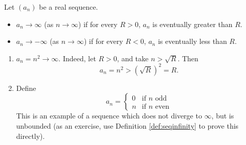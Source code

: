 \documentclass[../analysis1.tex]{subfiles}
\begin{document}
\begin{definition}
\label{def:seqinfinity}
    \begin{shaded*}
        Let $(a_n)$ be a real sequence.
        \begin{itemize}
            \item $a_n\to\infty$ (as $n\to\infty$) if for every $R>0$, $a_n$ is eventually greater than $R$.
            \item $a_n\to-\infty$ (as $n\to\infty$) if for every $R<0$, $a_n$ is eventually less than $R$.
        \end{itemize}
    \end{shaded*}
\end{definition}

\begin{example}\phantom{a}
    \begin{enumerate}
        \item[1.] $a_n=n^2\to\infty$. Indeed, let $R>0$, and take $n>\sqrt{R}$. Then $$a_n=n^2>(\sqrt{R})^2=R.$$
        \item[2.] Define $$a_n=\begin{cases}
            0 & \text{if }n\text{ odd}\\
            n & \text{if }n\text{ even}
        \end{cases}$$
        This is an example of a sequence which does not diverge to $\infty$, but is unbounded (as an exercise, use Definition \ref{def:seqinfinity} to prove this directly).
    \end{enumerate}
\end{example}
\end{document}
